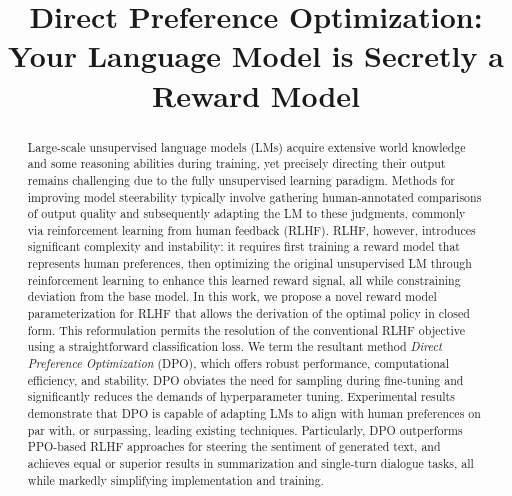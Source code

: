 \title{Direct Preference Optimization: Your Language Model is Secretly a Reward Model}

\begin{abstract}
Large-scale unsupervised language models (LMs) acquire extensive world knowledge and some reasoning abilities during training, yet precisely directing their output remains challenging due to the fully unsupervised learning paradigm. Methods for improving model steerability typically involve gathering human-annotated comparisons of output quality and subsequently adapting the LM to these judgments, commonly via reinforcement learning from human feedback (RLHF). RLHF, however, introduces significant complexity and instability: it requires first training a reward model that represents human preferences, then optimizing the original unsupervised LM through reinforcement learning to enhance this learned reward signal, all while constraining deviation from the base model. In this work, we propose a novel reward model parameterization for RLHF that allows the derivation of the optimal policy in closed form. This reformulation permits the resolution of the conventional RLHF objective using a straightforward classification loss. We term the resultant method \textit{Direct Preference Optimization} (DPO), which offers robust performance, computational efficiency, and stability. DPO obviates the need for sampling during fine-tuning and significantly reduces the demands of hyperparameter tuning. Experimental results demonstrate that DPO is capable of adapting LMs to align with human preferences on par with, or surpassing, leading existing techniques. Particularly, DPO outperforms PPO-based RLHF approaches for steering the sentiment of generated text, and achieves equal or superior results in summarization and single-turn dialogue tasks, all while markedly simplifying implementation and training.
\end{abstract}

